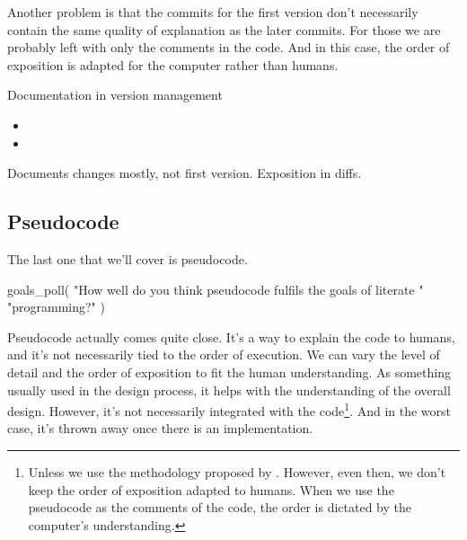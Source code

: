Another problem is that the commits for the first version don't necessarily 
contain the same quality of explanation as the later commits.
For those we are probably left with only the comments in the code.
And in this case, the order of exposition is adapted for the computer rather 
than humans.

\begin{frame}
\begin{block}{Documentation in version management}
  \begin{itemize}
    \item[\(\approx\)] {\color{orange}\LPexplain}
    \item[\(\approx\)] {\color{orange}\LPorder}
  \end{itemize}
\end{block}

\begin{remark}
  Documents changes mostly, not first version.
  Exposition in diffs.
\end{remark}
\end{frame}

\subsection{Pseudocode}

The last one that we'll cover is pseudocode.

\begin{frame}[fragile]
\begin{activity}
\begin{pycode}
goals_poll(
    "How well do you think pseudocode fulfils the goals of literate "
    "programming?"
)
\end{pycode}
\end{activity}
\end{frame}

Pseudocode actually comes quite close.
It's a way to explain the code to humans, and it's not necessarily tied to the 
order of execution.
We can vary the level of detail and the order of exposition to fit the human 
understanding.
As something usually used in the design process, it helps with the 
understanding of the overall design.
However, it's not necessarily integrated with the code\footnote{%
  Unless we use the methodology proposed by \textcite[Ch.~9]{CodeComplete}.
  However, even then, we don't keep the order of exposition adapted to humans.
  When we use the pseudocode as the comments of the code, the order is dictated 
  by the computer's understanding.
}.
And in the worst case, it's thrown away once there is an implementation.

